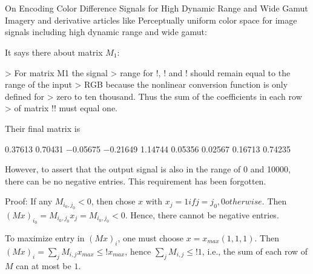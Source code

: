 \documentclass{scrartcl}
\begin{document}
\section{}
On Encoding Color Difference Signals for High Dynamic Range and Wide Gamut
Imagery and derivative articles like Perceptually uniform color space for image
signals including high dynamic range and wide gamut:

It says there about matrix $M_1$:

> For matrix M1 the signal
> range for !, ! and ! should remain equal to the range of the input
> RGB because the nonlinear conversion function is only defined for
> zero to ten thousand. Thus the sum of the coefficients in each row
> of matrix !! must equal one.

Their final matrix is

0.37613 0.70431 −0.05675
−0.21649 1.14744 0.05356
0.02567 0.16713 0.74235

However, to assert that the output signal is also in the range of 0 and 10000,
there can be no negative entries. This requirement has been forgotten.

Proof:
If any $M_{i_0, j_0}<0$, then chose
$x$ with $x_j={1 if j=j_0, 0 otherwise}$. Then $(Mx)_{i_0} = M_{i_0, j_0} x_j
=M_{i_0, j_0} < 0$. Hence, there cannot be negative entries.

To maximize entry in $(Mx)_i$, one must choose $x=x_{max} (1,1,1)$. Then
$(Mx)_i = \sum_j M_{i, j} x_{max} \le! x_{max}$, hence $\sum_j M_{i, j} \le!
1$, i.e., the sum of each row of $M$ can at most be $1$.
\end{document}
